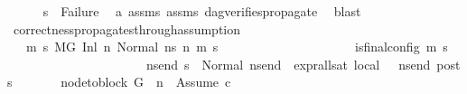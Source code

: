 \begin{isabellebody}
\ \ \ \ \isamarkupfalse%
\ {\isachardoublequoteopen}s{}\ {\isasymnoteq}\ Failure{\isachardoublequoteclose}\ \isamarkupfalse%
\ a{}\ assms{\isacharparenleft}{\kern0pt}{}{\isacharminus}{\kern0pt}{}{\isacharparenright}{\kern0pt}\ assms{\isacharparenleft}{\kern0pt}{}{\isacharparenright}{\kern0pt}\ dag{\isacharunderscore}{\kern0pt}verifies{\isacharunderscore}{\kern0pt}propagate\ \isamarkupfalse%
\ blast\ \isanewline
\ \ \isamarkupfalse%
\isanewline
{}\isamarkupfalse%
%
\endisatagproof
{\isafoldproof}%
%
\isadelimproof
\isanewline
%
\endisadelimproof
\isanewline
{}\isamarkupfalse%
\ correctness{\isacharunderscore}{\kern0pt}propagates{\isacharunderscore}{\kern0pt}through{\isacharunderscore}{\kern0pt}assumption{}{\isacharcolon}{\kern0pt}\isanewline
\ \ \ {\isachardoublequoteopen}{\isasymforall}m\ s{\isachardot}{\kern0pt}\ {\isacharparenleft}{\kern0pt}M{\isacharcomma}{\kern0pt}{\isasymLambda}{\isacharcomma}{\kern0pt}{\isasymGamma}{\isacharcomma}{\kern0pt}{\isasymOmega}{\isacharcomma}{\kern0pt}G\ {\isasymturnstile}{\isacharparenleft}{\kern0pt}Inl\ n{}{\isacharcomma}{\kern0pt}\ Normal\ ns{}{\isacharparenright}{\kern0pt}\ {\isacharminus}{\kern0pt}n{\isasymrightarrow}{\isacharasterisk}{\kern0pt}\ {\isacharparenleft}{\kern0pt}m{\isacharcomma}{\kern0pt}\ s{\isacharparenright}{\kern0pt}{\isacharparenright}{\kern0pt}\ {\isasymlongrightarrow}\ \isanewline
\ \ \ \ \ \ \ \ \ \ \ \ \ \ \ \ \ \ \ {\isacharparenleft}{\kern0pt}is{\isacharunderscore}{\kern0pt}final{\isacharunderscore}{\kern0pt}config\ {\isacharparenleft}{\kern0pt}m{\isacharcomma}{\kern0pt}\ s{\isacharparenright}{\kern0pt}\ {\isasymlongrightarrow}\ \isanewline
\ \ \ \ \ \ \ \ \ \ \ \ \ \ \ \ \ \ \ \ \ \ {\isacharparenleft}{\kern0pt}{\isasymforall}ns{\isacharunderscore}{\kern0pt}end{\isachardot}{\kern0pt}\ s\ {\isacharequal}{\kern0pt}\ Normal\ ns{\isacharunderscore}{\kern0pt}end\ {\isasymlongrightarrow}\ {\isacharparenleft}{\kern0pt}expr{\isacharunderscore}{\kern0pt}all{\isacharunderscore}{\kern0pt}sat\ {\isasymLambda}{}{\isacharunderscore}{\kern0pt}local\ {\isasymGamma}\ {\isasymOmega}\ ns{\isacharunderscore}{\kern0pt}end{\isacharparenright}{\kern0pt}\ posts{\isacharparenright}{\kern0pt}{\isacharparenright}{\kern0pt}{\isachardoublequoteclose}\isanewline
\ \ \ \ \ \ \ {\isachardoublequoteopen}node{\isacharunderscore}{\kern0pt}to{\isacharunderscore}{\kern0pt}block\ G\ {\isacharbang}{\kern0pt}\ n{}\ {\isacharequal}{\kern0pt}\ {\isacharbrackleft}{\kern0pt}Assume\ c{\isacharbrackright}{\kern0pt}{\isachardoublequoteclose}\isanewline

\end{isabellebody}
